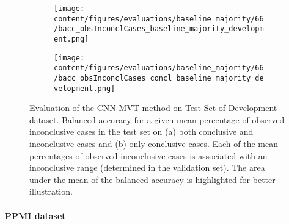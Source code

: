\begin{figure}[ht]
  \begin{subfigure}{0.5\textwidth}
    \centering
    \texttt{[image: content/figures/evaluations/baseline\_majority/66/bacc\_obsInconclCases\_baseline\_majority\_development.png]}
    \subcaption{}
    \label{fig:bacc_obsInconclCases_baseline_majority_development}
  \end{subfigure}
  \hfill
  \begin{subfigure}{0.5\textwidth}
    \centering
    \texttt{[image: content/figures/evaluations/baseline\_majority/66/bacc\_obsInconclCases\_concl\_baseline\_majority\_development.png]}
    \subcaption{}
    \label{fig:bacc_obsInconclCases_concl_baseline_majority_development}
  \end{subfigure}

  \caption{Evaluation of the CNN-MVT method on Test Set of Development dataset.
  Balanced accuracy for a given mean percentage of observed inconclusive cases in the test set on 
  (a) both conclusive and inconclusive cases and (b) only conclusive cases. 
  Each of the mean percentages of observed inconclusive cases is associated with an inconclusive range (determined in the validation set). 
  The area under the mean of the balanced accuracy is highlighted for better illustration.}
  \label{fig:bacc_obsInconclCases_baseline_majority_development_full}
\end{figure}




\paragraph{PPMI dataset}

